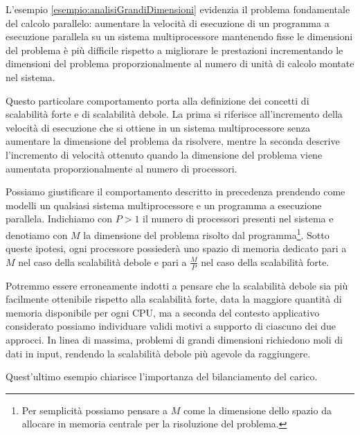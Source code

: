 L'esempio \ref{esempio:analisiGrandiDimensioni} evidenzia il problema fondamentale del calcolo parallelo: aumentare la velocit\`a di esecuzione
di un programma a esecuzione parallela su un sistema multiprocessore mantenendo fisse le dimensioni del problema \`e pi\`u difficile rispetto a migliorare
le prestazioni incrementando le dimensioni del problema proporzionalmente al numero di unit\`a di calcolo montate nel sistema.

Questo particolare comportamento porta alla definizione dei concetti di scalabilit\`a forte e di scalabilit\`a debole.\newline
La prima si riferisce all'incremento della velocit\`a di esecuzione che si ottiene in un sistema multiprocessore senza aumentare la dimensione del problema da
risolvere, mentre la seconda descrive l'incremento di velocit\`a ottenuto quando la dimensione del problema viene aumentata proporzionalmente al numero
di processori.

Possiamo giustificare il comportamento descritto in precedenza prendendo come modelli un qualsiasi sistema multiprocessore e un programma a esecuzione parallela.\newline
Indichiamo con $P > 1$ il numero di processori presenti nel
sistema e denotiamo con $M$ la dimensione del problema risolto dal programma\footnote{Per semplicit\`a possiamo pensare a $M$ come la dimensione dello spazio da allocare in memoria centrale per la
    risoluzione del problema.}.\newline
Sotto queste ipotesi, ogni processore possieder\`a uno spazio di memoria dedicato pari a $M$ nel caso della scalabilit\`a debole e pari a $\frac{M}{P}$ nel
caso della scalabilit\`a forte.

Potremmo essere erroneamente indotti a pensare che la scalabilit\`a debole sia pi\`u facilmente ottenibile rispetto alla scalabilit\`a forte, data la maggiore quantit\`a di memoria disponibile per ogni CPU, ma a seconda
del contesto applicativo considerato possiamo individuare validi motivi a supporto di ciascuno dei due approcci.\newline
In linea di massima, problemi di grandi
dimensioni richiedono moli di dati in input, rendendo la scalabilit\`a debole pi\`u agevole da raggiungere.

Quest'ultimo esempio chiarisce l'importanza del bilanciamento del carico.

